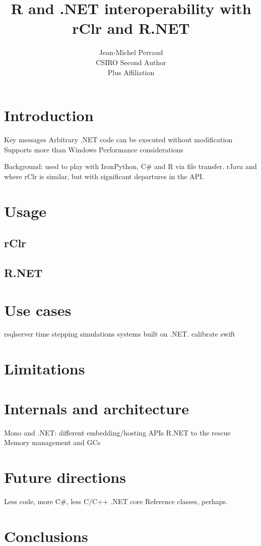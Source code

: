 \documentclass[codesnippet]{jss}
\author{Jean-Michel Perraud\\CSIRO \And 
        Second Author\\Plus Affiliation}
\title{R and .NET interoperability with rClr and R.NET}
\begin{document}
\maketitle

\section{Introduction}
Key messages
Arbitrary .NET code can be executed without modification
Supports more than Windows
Performance considerations

Background: 
used to play with IronPython, C# and R via file transfer. 
rJava and where rClr is similar, but with significant departures in the API.

\section{Usage}

\subsection{rClr}

\subsection{R.NET}

\section{Use cases}
rsqlserver
time stepping simulations systems built on .NET. 
calibrate swift

\section{Limitations}

\section{Internals and architecture}
Mono and .NET: different embedding/hosting APIs
R.NET to the rescue
Memory management and GCs

\section{Future directions}
Less code, more C#, less C/C++
.NET core
Reference classes, perhaps.

\section{Conclusions}
\end{document}
